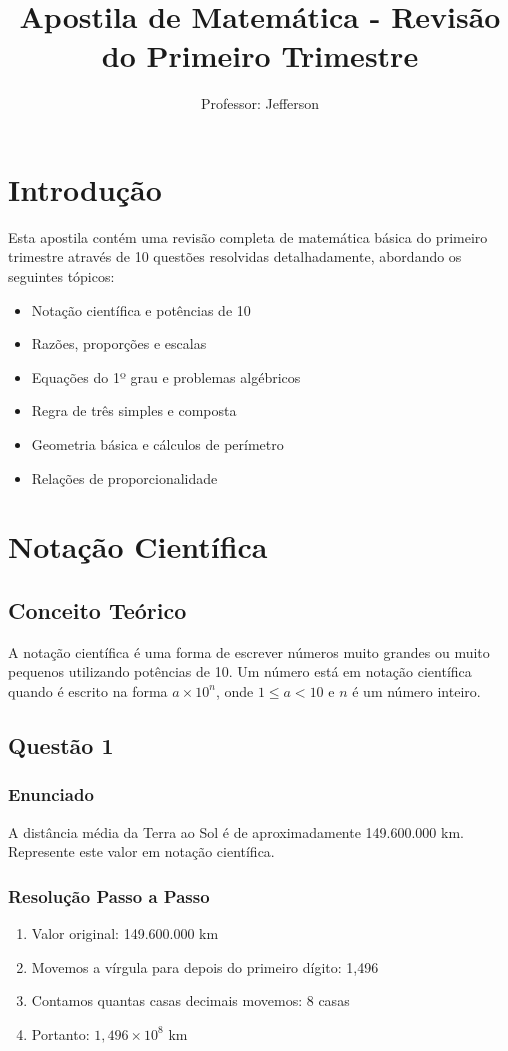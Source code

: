 \documentclass[11pt]{article}
\title{\textcolor{titleblue}{Apostila de Matemática - Revisão do Primeiro Trimestre}}
\author{Professor: Jefferson}
\date{}
\begin{document}
\maketitle

\tableofcontents

\section{Introdução}
Esta apostila contém uma revisão completa de matemática básica do primeiro trimestre através de 10 questões resolvidas detalhadamente, abordando os seguintes tópicos:

\begin{itemize}
\item Notação científica e potências de 10
\item Razões, proporções e escalas
\item Equações do 1º grau e problemas algébricos
\item Regra de três simples e composta
\item Geometria básica e cálculos de perímetro
\item Relações de proporcionalidade
\end{itemize}

\section{Notação Científica}

\subsection{Conceito Teórico}
A notação científica é uma forma de escrever números muito grandes ou muito pequenos utilizando potências de 10. Um número está em notação científica quando é escrito na forma $a \times 10^n$, onde $1 \leq a < 10$ e $n$ é um número inteiro.

\subsection{Questão 1}
\subsubsection*{Enunciado}
A distância média da Terra ao Sol é de aproximadamente 149.600.000 km. Represente este valor em notação científica.

\subsubsection*{Resolução Passo a Passo}
\begin{enumerate}
\item Valor original: 149.600.000 km
\item Movemos a vírgula para depois do primeiro dígito: 1,496
\item Contamos quantas casas decimais movemos: 8 casas
\item Portanto: $1,496 \times 10^8$ km
\end{enumerate}
\end{document}
